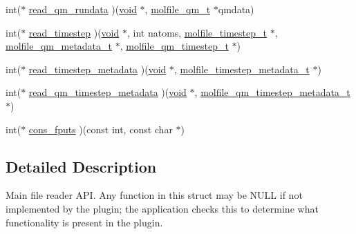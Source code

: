 \begin{DoxyCompactItemize}
\item 
int($\ast$ \hyperlink{structmolfile__plugin__t_a66b4938d266f03b30e38cc8bed9ad473}{read\-\_\-qm\-\_\-rundata} )(\hyperlink{nbnxn__kernel__simd__4xn__outer_8h_a8dc3f4a797ed992dff49d2fa3477eee8}{void} $\ast$, \hyperlink{structmolfile__qm__t}{molfile\-\_\-qm\-\_\-t} $\ast$qmdata)
\item 
int($\ast$ \hyperlink{structmolfile__plugin__t_a72589b78044886d6e2402c73fa2a72e9}{read\-\_\-timestep} )(\hyperlink{nbnxn__kernel__simd__4xn__outer_8h_a8dc3f4a797ed992dff49d2fa3477eee8}{void} $\ast$, int natoms, \hyperlink{structmolfile__timestep__t}{molfile\-\_\-timestep\-\_\-t} $\ast$, \hyperlink{structmolfile__qm__metadata__t}{molfile\-\_\-qm\-\_\-metadata\-\_\-t} $\ast$, \hyperlink{structmolfile__qm__timestep__t}{molfile\-\_\-qm\-\_\-timestep\-\_\-t} $\ast$)
\item 
int($\ast$ \hyperlink{structmolfile__plugin__t_a0b7ba8f821b21ab609aebe0b02947a71}{read\-\_\-timestep\-\_\-metadata} )(\hyperlink{nbnxn__kernel__simd__4xn__outer_8h_a8dc3f4a797ed992dff49d2fa3477eee8}{void} $\ast$, \hyperlink{molfile__plugin_8h_a3cfeeba48d6d13973def8761d2fad5f5}{molfile\-\_\-timestep\-\_\-metadata\-\_\-t} $\ast$)
\item 
int($\ast$ \hyperlink{structmolfile__plugin__t_a4928ec6da0a4e956c5bd4edeea429c57}{read\-\_\-qm\-\_\-timestep\-\_\-metadata} )(\hyperlink{nbnxn__kernel__simd__4xn__outer_8h_a8dc3f4a797ed992dff49d2fa3477eee8}{void} $\ast$, \hyperlink{molfile__plugin_8h_ae091e5e1e59b0dc4cecbfad539a50e27}{molfile\-\_\-qm\-\_\-timestep\-\_\-metadata\-\_\-t} $\ast$)
\item 
int($\ast$ \hyperlink{structmolfile__plugin__t_a190dffaa87f1debfa44a24aef6868365}{cons\-\_\-fputs} )(const int, const char $\ast$)
\end{DoxyCompactItemize}


\subsection{\-Detailed \-Description}
\-Main file reader \-A\-P\-I. \-Any function in this struct may be \-N\-U\-L\-L if not implemented by the plugin; the application checks this to determine what functionality is present in the plugin. 

